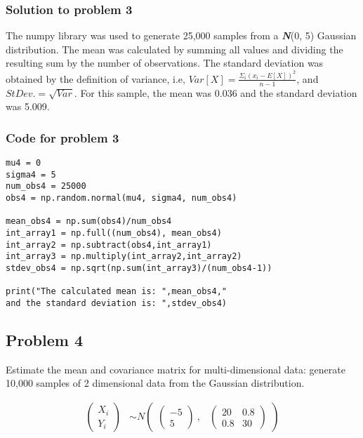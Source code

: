 \documentclass[12pt]{article}%
\begin{document}
\subsubsection{Solution to problem 3}

The numpy library was used to generate 25,000 samples from a \textit{\textbf{N}}(0, 5) Gaussian distribution. The mean was calculated by summing all values and dividing the resulting sum by the number of observations. The standard deviation was obtained by the definition of variance, i.e, $Var[X] = \frac{\Sigma_i (x_i-E[X])^2}{n-1}$, and $StDev. = \sqrt{Var}$. For this sample, the mean was 0.036 and the standard deviation was 5.009.\\

\subsubsection{Code for problem 3}
\begin{lstlisting}
mu4 = 0
sigma4 = 5
num_obs4 = 25000
obs4 = np.random.normal(mu4, sigma4, num_obs4)

mean_obs4 = np.sum(obs4)/num_obs4
int_array1 = np.full((num_obs4), mean_obs4)
int_array2 = np.subtract(obs4,int_array1)
int_array3 = np.multiply(int_array2,int_array2)
stdev_obs4 = np.sqrt(np.sum(int_array3)/(num_obs4-1))

print("The calculated mean is: ",mean_obs4,"
and the standard deviation is: ",stdev_obs4)
\end{lstlisting}



\subsection{Problem 4}

Estimate the mean and covariance matrix for multi-dimensional data: generate 10,000 samples of 2 dimensional data from the Gaussian distribution. 

\begin{align*}
\begin{pmatrix}X_{i}\\
Y_{i}
\end{pmatrix} &\sim  N
\begin{pmatrix}
\begin{pmatrix}
-5\\
5
\end{pmatrix}\ ,&
\begin{pmatrix}
20 & 0.8\\
0.8 & 30
\end{pmatrix}
\end{pmatrix}\\
\end{align*}
\end{document}
